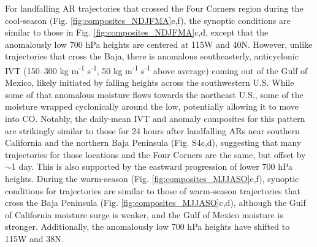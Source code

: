 \documentclass[draft]{agujournal2019}
\begin{document}
For landfalling AR trajectories that crossed the Four Corners region during the cool-season (Fig. \ref{fig:composites_NDJFMA}e,f), the synoptic conditions are similar to those in Fig. \ref{fig:composites_NDJFMA}c,d, except that the anomalously low 700 hPa heights are centered at 115\textdegree W and 40\textdegree N. However, unlike trajectories that cross the Baja, there is anomalous southeasterly, anticyclonic IVT (150--300 kg m\textsuperscript{-1} s\textsuperscript{-1}, 50 kg m\textsuperscript{-1} s\textsuperscript{-1} above average) coming out of the Gulf of Mexico, likely initiated by falling heights across the southwestern U.S. While some of that anomalous moisture flows towards the northeast U.S., some of the moisture wrapped cyclonically around the low, potentially allowing it to move into CO. Notably, the daily-mean IVT and anomaly composites for this pattern are strikingly similar to those for 24 hours after landfalling ARs near southern California and the northern Baja Peninsula (Fig. S4c,d), suggesting that many trajectories for those locations and the Four Corners are the same, but offset by $\sim$1 day. This is also supported by the eastward progression of lower 700 hPa heights. During the warm-season (Fig. \ref{fig:composites_MJJASO}e,f), synoptic conditions for trajectories are similar to those of warm-season trajectories that cross the Baja Peninsula (Fig. \ref{fig:composites_MJJASO}c,d), although the Gulf of California moisture surge is weaker, and the Gulf of Mexico moisture is stronger. Additionally, the anomalously low 700 hPa heights have shifted to 115\textdegree W and 38\textdegree N. 
\end{document}
